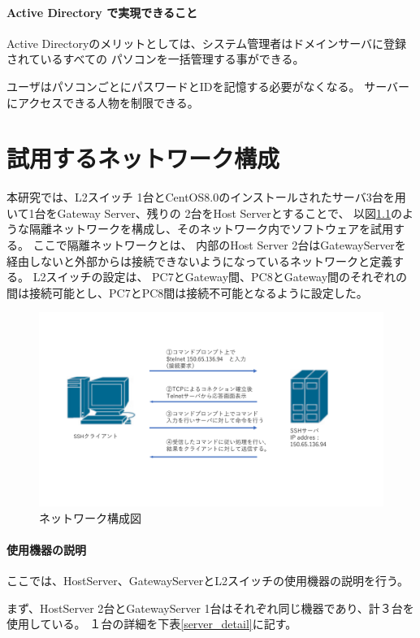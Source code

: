 \documentclass[11pt,a4j,titlepage]{jreport}
\begin{document}
\subsubsection*{Active Directory で実現できること}
Active Directoryのメリットとしては、システム管理者はドメインサーバに登録されているすべての
パソコンを一括管理する事ができる。

ユーザはパソコンごとにパスワードとIDを記憶する必要がなくなる。
サーバーにアクセスできる人物を制限できる。


\fi


\chapter{試用するネットワーク構成}
本研究では、L2スイッチ 1台とCentOS8.0のインストールされたサーバ3台を用いて1台をGateway Server、残りの
2台をHost Serverとすることで、
以図\ref{network_graph}のような隔離ネットワークを構成し、そのネットワーク内でソフトウェアを試用する。
ここで隔離ネットワークとは、
内部のHost Server 2台はGatewayServerを経由しないと外部からは接続できないようになっているネットワークと定義する。
L2スイッチの設定は、
PC7とGateway間、PC8とGateway間のそれぞれの間は接続可能とし、PC7とPC8間は接続不可能となるように設定した。

\begin{figure}[tbp]
    \centering
    \includegraphics*[width=1.0\textwidth,page=2]{graphs/network_archtecture.pdf}
    \caption{ネットワーク構成図}
    \label{network_graph}
\end{figure}

\subsubsection{使用機器の説明}
ここでは、HostServer、GatewayServerとL2スイッチの使用機器の説明を行う。\par
まず、HostServer 2台とGatewayServer 1台はそれぞれ同じ機器であり、計３台を使用している。
１台の詳細を下表\ref{server_detail}に記す。
\end{document}
